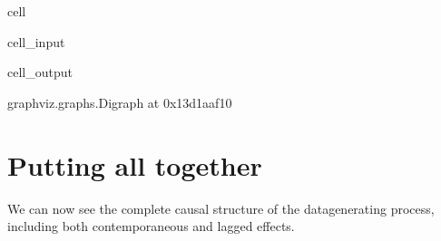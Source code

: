 \documentclass[letterpaper,10pt,english]{jupyterBook}
\begin{document}
\begin{sphinxuseclass}{cell}\begin{sphinxVerbatimInput}

\begin{sphinxuseclass}{cell_input}
\begin{sphinxVerbatim}[commandchars=\\\{\}]
  \PYG{p}{[}  \PYG{p}{]}
 
\end{sphinxVerbatim}

\end{sphinxuseclass}\end{sphinxVerbatimInput}
\begin{sphinxVerbatimOutput}

\begin{sphinxuseclass}{cell_output}
\begin{sphinxVerbatim}[commandchars=\\\{\}]
\PYGZlt{}graphviz.graphs.Digraph at 0x13d1aaf10\PYGZgt{}
\end{sphinxVerbatim}

\end{sphinxuseclass}\end{sphinxVerbatimOutput}

\end{sphinxuseclass}

\section{Putting all together}
\label{\detokenize{notebooks/semiparametric_varlingam:putting-all-together}}
\sphinxAtStartPar
We can now see the complete causal structure of the data\sphinxhyphen{}generating process, including both contemporaneous and lagged effects.
\end{document}
